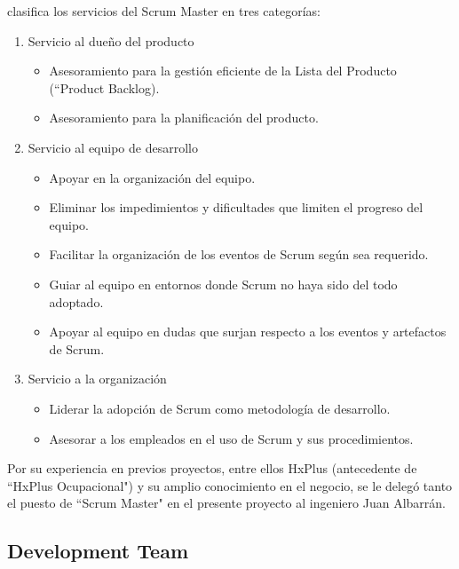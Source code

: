         \citeauthor{scrum-guia}\cite{scrum-guia} clasifica los servicios del Scrum Master en tres categorías:
        \begin{enumerate}
            \item Servicio al dueño del producto
            \begin{itemize}
                \item Asesoramiento para la gestión eficiente de la Lista del Producto (``Product Backlog).
                \item Asesoramiento para la planificación del producto.
            \end{itemize}
            
            \item Servicio al equipo de desarrollo
            \begin{itemize}
                \item Apoyar en la organización del equipo.
                \item Eliminar los impedimientos y dificultades que limiten el progreso del equipo.
                \item Facilitar la organización de los eventos de Scrum según sea requerido.
                \item Guiar al equipo en entornos donde Scrum no haya sido del todo adoptado.
                \item Apoyar al equipo en dudas que surjan respecto a los eventos y artefactos de Scrum.
            \end{itemize}
            \item Servicio a la organización
            \begin{itemize}
                \item Liderar la adopción de Scrum como metodología de desarrollo.
                \item Asesorar a los empleados en el uso de Scrum y sus procedimientos.
            \end{itemize}
        \end{enumerate}
        
       Por su experiencia en previos proyectos, entre ellos HxPlus (antecedente de ``HxPlus Ocupacional") y su amplio conocimiento en el negocio, se le delegó tanto el puesto de ``Scrum Master" en el presente proyecto al ingeniero Juan Albarrán.
        
        \subsection{Development Team}
        \label{development-team}
        
